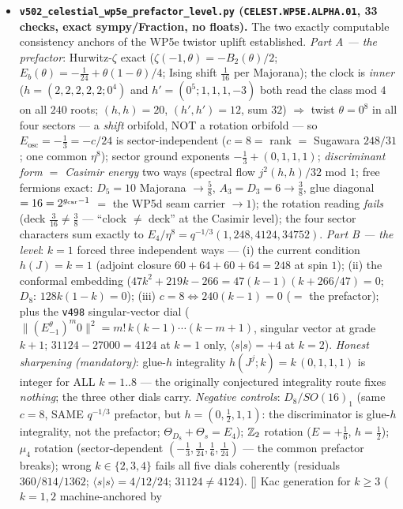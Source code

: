 \begin{itemize}[leftmargin=1.5em]
\item \textbf{\texttt{v502\_celestial\_wp5e\_prefactor\_level.py} (\texttt{CELEST.WP5E.ALPHA.01}, 33
checks, exact sympy/Fraction, no floats).} The two exactly computable consistency anchors of the
WP5e twistor uplift established. \emph{Part A --- the prefactor}: Hurwitz-$\zeta$ exact
($\zeta(-1,\theta)=-B_2(\theta)/2$; $E_b(\theta)=-\tfrac1{24}+\theta(1-\theta)/4$; Ising shift
$\tfrac1{16}$ per Majorana); the clock is \emph{inner} ($h=(2,2,2,2,2;0^4)$ and $h'=(0^5;1,1,1,-3)$
both read the class mod $4$ on all $240$ roots; $(h,h)=20$, $(h',h')=12$, sum $32$) $\Rightarrow$
twist $\theta=0^8$ in all four sectors --- a \emph{shift} orbifold, NOT a rotation orbifold ---
so $E_{\mathrm{osc}}=-\tfrac13=-c/24$ is sector-independent ($c=8=$ rank $=$ Sugawara $248/31$;
one common $\eta^8$); sector ground exponents $-\tfrac13+(0,1,1,1)$; \emph{discriminant form $=$
Casimir energy} two ways (spectral flow $j^2(h,h)/32$ mod $1$; free fermions exact: $D_5=10$
Majorana $\to\tfrac58$, $A_3=D_3=6\to\tfrac38$, glue diagonal $=16=2^{g_{\mathrm{car}}-1}$ $=$ the WP5d seam
carrier $\to1$); the rotation reading \emph{fails} (deck $\tfrac3{16}\neq\tfrac38$ --- ``clock
$\neq$ deck'' at the Casimir level); the four sector characters sum exactly to
$E_4/\eta^8=q^{-1/3}(1,248,4124,34752)$. \emph{Part B --- the level}: $k=1$ forced three
independent ways --- (i) the current condition $h(J)=k=1$ (adjoint closure $60{+}64{+}60{+}64=248$
at spin $1$); (ii) the conformal embedding ($47k^2{+}219k{-}266=47(k{-}1)(k{+}266/47)=0$; $D_8$:
$128k(1{-}k)=0$); (iii) $c=8\Leftrightarrow240(k{-}1)=0$ ($=$ the prefactor); plus the \texttt{v498}
singular-vector dial ($\|(E^\theta_{-1})^m0\|^2=m!\,k(k{-}1)\cdots(k{-}m{+}1)$, singular vector at
grade $k{+}1$; $31124-27000=4124$ at $k{=}1$ only, $\langle s|s\rangle=+4$ at $k{=}2$).
\emph{Honest sharpening (mandatory)}: glue-$h$ integrality $h(J^j;k)=k\,(0,1,1,1)$ is integer for
ALL $k=1..8$ --- the originally conjectured integrality route fixes \emph{nothing}; the three other
dials carry. \emph{Negative controls}: $D_8/SO(16)_1$ (same $c=8$, SAME $q^{-1/3}$ prefactor, but
$h=(0,\tfrac12,1,1)$: the discriminator is glue-$h$ integrality, not the prefactor;
$\Theta_{D_8}+\Theta_s=E_4$); $\mathbb{Z}_2$ rotation ($E=+\tfrac16$, $h=\tfrac12$); $\mu_4$ rotation
(sector-dependent $(-\tfrac13,\tfrac1{24},\tfrac16,\tfrac1{24})$ --- the common prefactor breaks);
wrong $k\in\{2,3,4\}$ fails all five dials coherently (residuals $360/814/1362$; $\langle
s|s\rangle=4/12/24$; $31124\neq4124$). [\mC] Kac generation for $k\ge3$ ($k=1,2$ machine-anchored by

\end{itemize}
